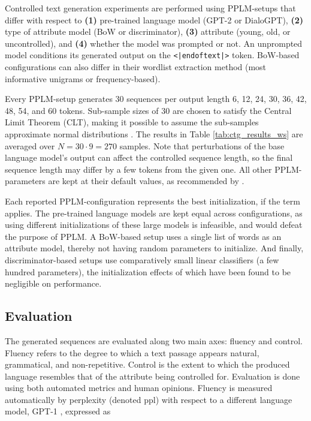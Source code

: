 Controlled text generation experiments are performed using PPLM-setups that differ with respect to \textbf{(1)} pre-trained language model (GPT-2 or DialoGPT), \textbf{(2)} type of attribute model (BoW or discriminator), \textbf{(3)} attribute (young, old, or uncontrolled), and \textbf{(4)} whether the model was prompted or not. An unprompted model conditions its generated output on the \texttt{<|endoftext|>} token. BoW-based configurations can also differ in their wordlist extraction method (most informative unigrams or frequency-based). 

Every PPLM-setup generates 30 sequences per output length 6, 12, 24, 30, 36, 42, 48, 54, and 60 tokens. Sub-sample sizes of 30 are chosen to satisfy the Central Limit Theorem (CLT), making it possible to assume the sub-samples approximate normal distributions \citep{CLT2008springer}. The results in Table \ref{tab:ctg_results_ws} are averaged over $N = 30 \cdot 9 = 270$ samples.
Note that perturbations of the base language model's output can affect the controlled sequence length, so the final sequence length may differ by a few tokens from the given one. All other PPLM-parameters are kept at their default values, as recommended by \cite{dathathri2019plug}. 

Each reported PPLM-configuration represents the best initialization, if the term applies. The pre-trained language models are kept equal across configurations, as using different initializations of these large models is infeasible, and would defeat the purpose of PPLM. A BoW-based setup uses a single list of words as an attribute model, thereby not having random parameters to initialize. And finally, discriminator-based setups use comparatively small linear classifiers (a few hundred parameters), the initialization effects of which have been found to be negligible on performance.


\subsection{Evaluation }

The generated sequences are evaluated along two main axes: fluency and control. Fluency refers to the degree to which a text passage appears natural, grammatical, and non-repetitive. Control is the extent to which the produced language resembles that of the attribute being controlled for. Evaluation is done using both automated metrics and human opinions. Fluency is measured automatically by perplexity (denoted ppl) with respect to a different language model, GPT-1 \citep{radford2018improving}, expressed as

